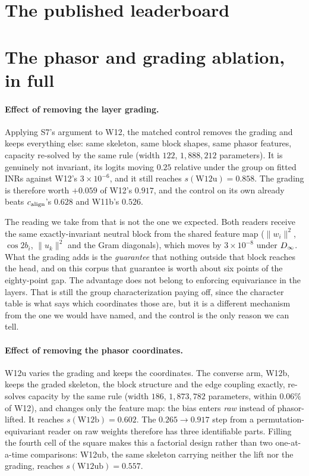 \section{The published leaderboard}\label{app:bench}





\section{The phasor and grading ablation, in full}\label{app:square}

\paragraph{Effect of removing the layer grading.} Applying S7's argument to W12,
the matched control removes the grading and keeps everything else: same skeleton, same block shapes,
same phasor features, capacity re-solved by the same rule (width $122$, $1{,}888{,}212$ parameters).
It is genuinely not invariant, its logits moving $0.25$ relative under the group on fitted INRs
against W12's $3\times10^{-6}$, and it still reaches $s(\mathrm{W12u}) = \mathbf{0.858}$. The
grading is therefore worth $+0.059$ of W12's $0.917$, and the control on its own already beats
$c_{\mathrm{align}}$'s $0.628$ and W11b's $0.526$.

The reading we take from that is not the one we expected. Both readers receive the same
exactly-invariant neutral block from the shared feature map ($\|w_i\|^2$, $\cos 2b_i$,
$\|u_k\|^2$ and the Gram diagonals), which moves by $3\times10^{-8}$ under $D_\infty$. What the grading
adds is the \emph{guarantee} that nothing outside that block reaches the head, and on this corpus
that guarantee is worth about six points of the eighty-point gap. The advantage does not belong to
enforcing equivariance in the layers. That is still the group characterization paying off, since the character
table is what says which coordinates those are, but it is a different mechanism from the one we
would have named, and the control is the only reason we can tell.

\paragraph{Effect of removing the phasor coordinates.} W12u varies the
grading and keeps the coordinates. The converse arm, W12b, keeps the graded skeleton, the block
structure and the edge coupling exactly, re-solves capacity by the same rule (width $186$,
$1{,}873{,}782$ parameters, within $0.06\%$ of W12), and changes only the feature map: the bias
enters \emph{raw} instead of phasor-lifted. It reaches $s(\mathrm{W12b}) = \mathbf{0.602}$. The
$0.265 \to 0.917$ step from a permutation-equivariant reader on raw weights therefore has three
identifiable parts. Filling the fourth cell of the square makes this a factorial design rather than
two one-at-a-time comparisons: W12ub, the same skeleton carrying neither the lift nor the grading,
reaches $s(\mathrm{W12ub}) = \mathbf{0.557}$.


